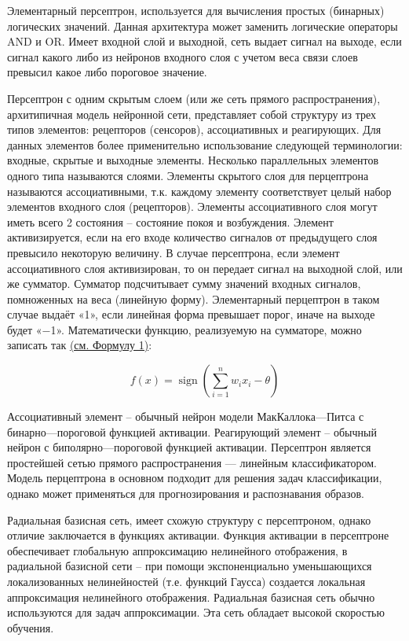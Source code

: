     Элементарный персептрон, используется для вычисления простых (бинарных) логических значений. Данная архитектура может заменить логические операторы AND и OR. Имеет входной слой и выходной, сеть выдает сигнал на выходе, если сигнал какого либо из нейронов входного слоя с учетом веса связи слоев превысил какое либо пороговое значение.

    Персептрон с одним скрытым слоем (или же сеть прямого распространения), архитипичная модель нейронной сети, представляет собой структуру из трех типов элементов: рецепторов (сенсоров), ассоциативных и реагирующих. Для данных элементов более применительно использование следующей терминологии: входные, скрытые и выходные элементы. Несколько параллельных элементов одного типа называются слоями. Элементы скрытого слоя для перцептрона называются ассоциативными, т.к. каждому элементу соответствует целый набор элементов входного слоя (рецепторов). Элементы ассоциативного слоя могут иметь всего 2 состояния – состояние покоя и возбуждения. Элемент активизируется, если на его входе количество сигналов от предыдущего слоя превысило некоторую величину. В случае персептрона, если элемент ассоциативного слоя активизирован, то он передает сигнал на выходной слой, или же сумматор. Сумматор подсчитывает сумму значений входных сигналов, помноженных на веса (линейную форму). Элементарный перцептрон в таком случае выдаёт «1», если линейная форма превышает порог, иначе на выходе будет «−1». Математически функцию, реализуемую на сумматоре, можно записать так \hyperref[eq:eq1]{(см. Формулу 1)}:

    \begin{equation}
        f(x)=\operatorname{sign}\left(\sum_{i=1}^n w_i x_i-\theta\right)
        \label{eq:eq1}
    \end{equation}

    Ассоциативный элемент – обычный нейрон модели МакКаллока—Питса с бинарно—пороговой функцией активации. Реагирующий элемент – обычный нейрон с биполярно—пороговой функцией активации. Персептрон является простейшей сетью прямого распространения — линейным классификатором. Модель перцептрона в основном подходит для решения задач классификации, однако может применяться для прогнозирования и распознавания образов. 

    Радиальная базисная сеть, имеет схожую структуру с персептроном, однако отличие заключается в функциях активации. Функция активации в персептроне обеспечивает глобальную аппроксимацию нелинейного отображения, в радиальной базисной сети – при помощи экспоненциально уменьшающихся локализованных нелинейностей (т.е. функций Гаусса) создается локальная аппроксимация нелинейного отображения. Радиальная базисная сеть обычно используются для задач аппроксимации. Эта сеть обладает высокой скоростью обучения. 
    
